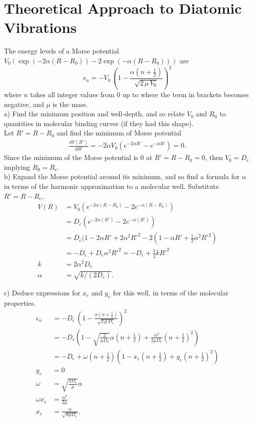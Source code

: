 \documentclass{article}
\begin{document}
\pagebreak

\section*{Theoretical Approach to Diatomic Vibrations}

The energy levels of a Morse potential $V_0(\exp(-2\alpha (R-R_0)) -2 \exp(-\alpha (R-R_0)))$
are
\begin{equation}
\epsilon_n = -V_0\, \left( 1 - \frac{\alpha (n+\frac{1}{2})}{\sqrt{2\, \mu\, V_0}} \right)^2
\end{equation}
where $n$ takes all integer values from 0 up to where the term in brackets
becomes negative, and $\mu$ is the mass.
\\

\noindent a) Find the minimum position and well-depth, and so relate $V_0$ and $R_0$ to
quantities in molecular binding curves (if they had this shape).
\\

{\color{blue} Let $R'=R-R_0$ and find the minimum of Morse potential
  \begin{align}
    \frac{dV(R')}{dR'} = -2\alpha V_0(e^{-2\alpha R'}-e^{-\alpha R'}) = 0.
  \end{align}
  Since the minimum of the Morse potential is 0 at $R'=R-R_0=0$, then $V_0=D_e$ implying
  $R_0=R_e$.
}
\\

\noindent b) Expand the Morse potential around its minimum, and so find a formula for $\alpha$
in terms of the harmonic approximation to a molecular well.
{\color{blue}
  Substitute $R'=R-R_e$,
  \begin{align*}
    V(R) & = V_0(e^{-2\alpha(R-R_0)}-2e^{-\alpha(R-R_0)}) \\
    & = D_e(e^{-2\alpha(R')}-2e^{-\alpha(R')}) \\
    & = D_e(1-2\alpha R' + 2\alpha^2R'^2 -2(1-\alpha R' +\frac{1}{2}\alpha^2R'^2) \\
    & = -D_e + D_e\alpha^2R'^2 = -D_e + \frac{1}{2}kR'^2 \\
    k & = 2\alpha^2D_e \\
    \alpha & = \sqrt{k/(2D_e)}.
  \end{align*}
}

\noindent c) Deduce expressions for $x_e$ and $y_e$ for this well, in terms of the molecular
properties.
{\color{blue}
  \begin{align*}
    \epsilon_n & = -D_e\, \left( 1 - \frac{\alpha (n+\frac{1}{2})}{\sqrt{2\, \mu\, D_e}} \right)^2 \\
    & = - D_e(1 - \sqrt{\frac{2}{\mu D_e}}\alpha(n+\frac{1}{2}) +\frac{\alpha^2}{2\mu D_e}(n+\frac{1}{2})^2)\\
    & = - D_e + \omega(n+\frac{1}{2})(1-x_e(n+\frac{1}{2})+y_e(n+\frac{1}{2})^2) \\
    y_e & = 0 \\
    \omega & = \sqrt{\frac{2 D_e}{\mu}}\alpha \\
    \omega x_e & = \frac{\alpha^2}{2\mu} \\
    x_e & = \frac{\alpha}{\sqrt{8\mu D_e}}.
  \end{align*}
  }
\end{document}

